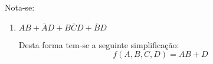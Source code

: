 \documentclass{article}
\begin{document}
            \begin{resolution}
                Nota-se:
                \begin{enumerate}[label=(\alph*), rightmargin = \leftmargin]
                    \item $AB + \overline{A}D + B\overline{C}D + \overline{B}D$
                        \begin{figure}[H]
                            \centering
                            \begin{karnaugh-map}[4][4][1][$A\;B$][$C\;D$]
                            \end{karnaugh-map}
                        \end{figure}\noindent
                    Desta forma tem-se a seguinte simplificação:
                        \begin{equation}
                            \boxed{
                                f(A,B,C,D) = AB + D
                            }
                        \end{equation}
\newpage


\end{enumerate}
\end{resolution}
\end{document}
